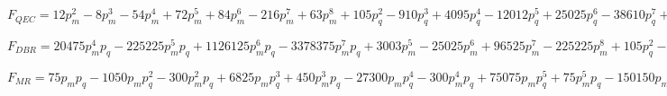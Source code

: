 $F_{QEC} = 12p_{m}^{2} - 8p_{m}^{3} - 54p_{m}^{4} + 72p_{m}^{5} + 84p_{m}^{6} - 216p_{m}^{7} + 63p_{m}^{8} + 105p_{q}^{2} - 910p_{q}^{3} + 4095p_{q}^{4} - 12012p_{q}^{5} + 25025p_{q}^{6} - 38610p_{q}^{7} + 45045p_{q}^{8} - 1260p_{m}^{2}p_{q}^{2} + 10920p_{m}^{2}p_{q}^{3} + 840p_{m}^{3}p_{q}^{2} - 49140p_{m}^{2}p_{q}^{4} - 7280p_{m}^{3}p_{q}^{3} + 5670p_{m}^{4}p_{q}^{2} + 144144p_{m}^{2}p_{q}^{5} + 32760p_{m}^{3}p_{q}^{4} - 49140p_{m}^{4}p_{q}^{3} - 7560p_{m}^{5}p_{q}^{2} - 300300p_{m}^{2}p_{q}^{6} - 96096p_{m}^{3}p_{q}^{5} + 221130p_{m}^{4}p_{q}^{4} + 65520p_{m}^{5}p_{q}^{3} - 8820p_{m}^{6}p_{q}^{2}$

$F_{DBR} = 20475p_{m}^{4}p_{q} - 225225p_{m}^{5}p_{q} + 1126125p_{m}^{6}p_{q} - 3378375p_{m}^{7}p_{q} + 3003p_{m}^{5} - 25025p_{m}^{6} + 96525p_{m}^{7} - 225225p_{m}^{8} + 105p_{q}^{2} - 910p_{q}^{3} + 4095p_{q}^{4} - 12012p_{q}^{5} + 25025p_{q}^{6} - 38610p_{q}^{7} + 45045p_{q}^{8} - 286650p_{m}^{4}p_{q}^{2} + 1863225p_{m}^{4}p_{q}^{3} + 2837835p_{m}^{5}p_{q}^{2} - 7452900p_{m}^{4}p_{q}^{4} - 17762745p_{m}^{5}p_{q}^{3} - 13138125p_{m}^{6}p_{q}^{2}$

$F_{MR} = 75p_{m}p_{q} - 1050p_{m}p_{q}^{2} - 300p_{m}^{2}p_{q} + 6825p_{m}p_{q}^{3} + 450p_{m}^{3}p_{q} - 27300p_{m}p_{q}^{4} - 300p_{m}^{4}p_{q} + 75075p_{m}p_{q}^{5} + 75p_{m}^{5}p_{q} - 150150p_{m}p_{q}^{6} + 225225p_{m}p_{q}^{7} + 10p_{m}^{2} - 20p_{m}^{3} + 15p_{m}^{4} - 4p_{m}^{5} + 105p_{q}^{2} - 910p_{q}^{3} + 4095p_{q}^{4} - 12012p_{q}^{5} + 25025p_{q}^{6} - 38610p_{q}^{7} + 45045p_{q}^{8} + 3150p_{m}^{2}p_{q}^{2} - 18200p_{m}^{2}p_{q}^{3} - 4200p_{m}^{3}p_{q}^{2} + 68250p_{m}^{2}p_{q}^{4} + 22750p_{m}^{3}p_{q}^{3} + 2625p_{m}^{4}p_{q}^{2} - 180180p_{m}^{2}p_{q}^{5} - 81900p_{m}^{3}p_{q}^{4} - 13650p_{m}^{4}p_{q}^{3} - 630p_{m}^{5}p_{q}^{2} + 350350p_{m}^{2}p_{q}^{6} + 210210p_{m}^{3}p_{q}^{5} + 47775p_{m}^{4}p_{q}^{4} + 3185p_{m}^{5}p_{q}^{3}$